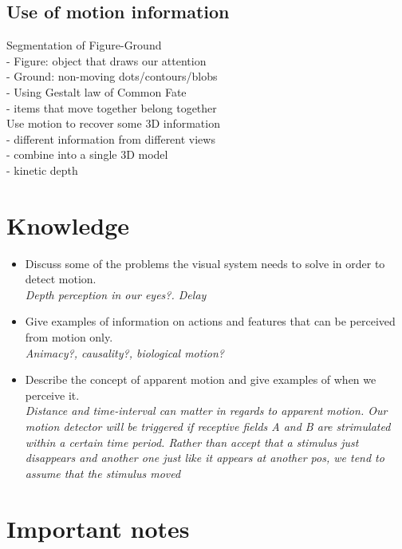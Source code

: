 \documentclass{article}
\begin{document}
\subsection{Use of motion information}
Segmentation of Figure-Ground\\
- Figure: object that draws our attention\\
- Ground: non-moving dots/contours/blobs\\
- Using Gestalt law of Common Fate\\
- items that move together belong together\\

Use motion to recover some 3D information\\
- different information from different views\\
- combine into a single 3D model\\
- kinetic depth\\
\section{Knowledge}
\begin{itemize}
  \item Discuss some of the problems the visual system needs to solve in order to detect motion.\\
    \textit{Depth perception in our eyes?. Delay}
  \item Give examples of information on actions and features that can be perceived from motion only.\\
    \textit{Animacy?, causality?, biological motion?}
  \item Describe the concept of apparent motion and give examples of when we perceive it.\\
    \textit{Distance and time-interval can matter in regards to apparent motion. Our motion detector will be triggered if receptive fields A and B are strimulated within a certain time period. Rather than accept that a stimulus just disappears and another one just like it appears at another pos, we tend to assume that the stimulus moved}
\end{itemize}

\section{Important notes}
\end{document}

